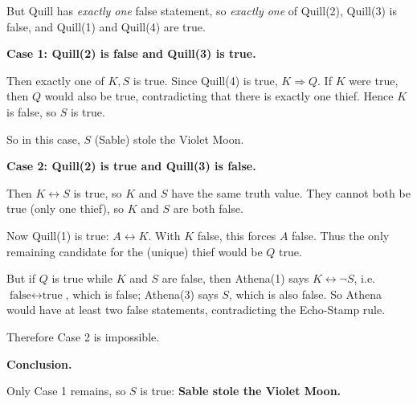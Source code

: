 But Quill has \emph{exactly one} false statement, so \emph{exactly one} of Quill(2), Quill(3) is false, and Quill(1) and Quill(4) are true.

\textbf{Case 1: Quill(2) is false and Quill(3) is true.}

Then exactly one of \(K,S\) is true.
Since Quill(4) is true, \(K \Rightarrow Q\).
If \(K\) were true, then \(Q\) would also be true, contradicting that there is exactly one thief.
Hence \(K\) is false, so \(S\) is true.

So in this case, \(S\) (Sable) stole the Violet Moon.

\textbf{Case 2: Quill(2) is true and Quill(3) is false.}

Then \(K \leftrightarrow S\) is true, so \(K\) and \(S\) have the same truth value.
They cannot both be true (only one thief), so \(K\) and \(S\) are both false.

Now Quill(1) is true: \(A \leftrightarrow K\).
With \(K\) false, this forces \(A\) false.
Thus the only remaining candidate for the (unique) thief would be \(Q\) true.

But if \(Q\) is true while \(K\) and \(S\) are false, then Athena(1) says
\(K \leftrightarrow \neg S\), i.e.\ \(\text{false} \leftrightarrow \text{true}\), which is false;
Athena(3) says \(S\), which is also false.
So Athena would have at least two false statements, contradicting the Echo-Stamp rule.

Therefore Case 2 is impossible.

\textbf{Conclusion.}

Only Case 1 remains, so \(S\) is true: \textbf{Sable stole the Violet Moon.}


\NextPage
